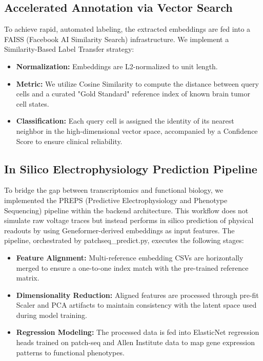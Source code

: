 \documentclass[conference]{IEEEtran}
\begin{document}
\subsection{Accelerated Annotation via Vector Search}
To achieve rapid, automated labeling, the extracted embeddings are fed into a FAISS (Facebook AI Similarity Search) infrastructure. We implement a Similarity-Based Label Transfer strategy:

\begin{itemize}
    \item \textbf{Normalization:} Embeddings are L2-normalized to unit length.
    \item \textbf{Metric:} We utilize Cosine Similarity to compute the distance between query cells and a curated "Gold Standard" reference index of known brain tumor cell states.
    \item \textbf{Classification:} Each query cell is assigned the identity of its nearest neighbor in the high-dimensional vector space, accompanied by a Confidence Score to ensure clinical reliability.
\end{itemize}

\subsection{In Silico Electrophysiology Prediction Pipeline}
To bridge the gap between transcriptomics and functional biology, we implemented the PREPS (Predictive Electrophysiology and Phenotype Sequencing) pipeline within the backend architecture. This workflow does not simulate raw voltage traces but instead performs in silico prediction of physical readouts by using Geneformer-derived embeddings as input features. The pipeline, orchestrated by patchseq\_predict.py, executes the following stages:
\begin{itemize}
    \item \textbf{Feature Alignment:} Multi-reference embedding CSVs are horizontally merged to ensure a one-to-one index match with the pre-trained reference matrix.
    \item \textbf{Dimensionality Reduction:} Aligned features are processed through pre-fit Scaler and PCA artifacts to maintain consistency with the latent space used during model training.
    \item \textbf{Regression Modeling:} The processed data is fed into ElasticNet regression heads trained on patch-seq and Allen Institute data to map gene expression patterns to functional phenotypes.
\end{itemize}
\end{document}
